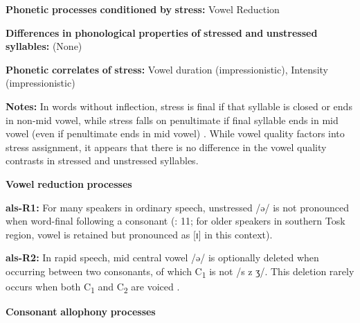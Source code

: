 \begin{styleBody}
\textbf{Phonetic} \textbf{processes} \textbf{conditioned} \textbf{by} \textbf{stress:} Vowel Reduction
\end{styleBody}

\begin{styleBody}
\textbf{Differences} \textbf{in} \textbf{phonological} \textbf{properties} \textbf{of} \textbf{stressed} \textbf{and} \textbf{unstressed} \textbf{syllables:} (None)
\end{styleBody}

\begin{styleBody}
\textbf{Phonetic} \textbf{correlates} \textbf{of} \textbf{stress:} Vowel duration (impressionistic), Intensity (impressionistic)
\end{styleBody}

\begin{styleBody}
\textbf{Notes:} In words without inflection, stress is final if that syllable is closed or ends in non-mid vowel, while stress falls on penultimate if final syllable ends in mid vowel (even if penultimate ends in mid vowel) \citep{Trommer2013}. While vowel quality factors into stress assignment, it appears that there is no difference in the vowel quality contrasts in stressed and unstressed syllables.
\end{styleBody}

\begin{styleBody}
\textbf{Vowel} \textbf{reduction} \textbf{processes}
\end{styleBody}

\begin{styleBody}
\textbf{als-R1:} For many speakers in ordinary speech, unstressed /ə/ is not pronounced when word-final following a consonant (\citealt{NewmarkEtAl1982}: 11; for older speakers in southern Tosk region, vowel is retained but pronounced as [ɪ] in this context).
\end{styleBody}

\begin{styleBody}
\textbf{als-R2:} In rapid speech, mid central vowel /ə/ is optionally deleted when occurring between two consonants, of which C\textsubscript{1} is not /s z ʒ/. This deletion rarely occurs when both C\textsubscript{1} and C\textsubscript{2} are voiced \citep[21-2]{Klippenstein2010}.
\end{styleBody}

\begin{styleBody}
\textbf{Consonant} \textbf{allophony} \textbf{processes}
\end{styleBody}

